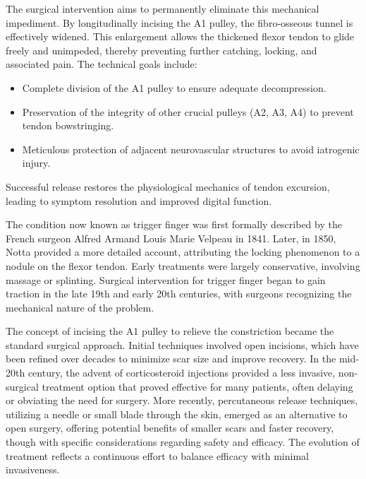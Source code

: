 The surgical intervention aims to permanently eliminate this mechanical impediment. By longitudinally incising the A1 pulley, the fibro-osseous tunnel is effectively widened. This enlargement allows the thickened flexor tendon to glide freely and unimpeded, thereby preventing further catching, locking, and associated pain. The technical goals include:
\begin{itemize}
  \item Complete division of the A1 pulley to ensure adequate decompression.
  \item Preservation of the integrity of other crucial pulleys (A2, A3, A4) to prevent tendon bowstringing.
  \item Meticulous protection of adjacent neurovascular structures to avoid iatrogenic injury.
\end{itemize}
Successful release restores the physiological mechanics of tendon excursion, leading to symptom resolution and improved digital function.

The condition now known as trigger finger was first formally described by the French surgeon Alfred Armand Louis Marie Velpeau in 1841. Later, in 1850, Notta provided a more detailed account, attributing the locking phenomenon to a nodule on the flexor tendon. Early treatments were largely conservative, involving massage or splinting. Surgical intervention for trigger finger began to gain traction in the late 19th and early 20th centuries, with surgeons recognizing the mechanical nature of the problem.

The concept of incising the A1 pulley to relieve the constriction became the standard surgical approach. Initial techniques involved open incisions, which have been refined over decades to minimize scar size and improve recovery. In the mid-20th century, the advent of corticosteroid injections provided a less invasive, non-surgical treatment option that proved effective for many patients, often delaying or obviating the need for surgery. More recently, percutaneous release techniques, utilizing a needle or small blade through the skin, emerged as an alternative to open surgery, offering potential benefits of smaller scars and faster recovery, though with specific considerations regarding safety and efficacy. The evolution of treatment reflects a continuous effort to balance efficacy with minimal invasiveness.

